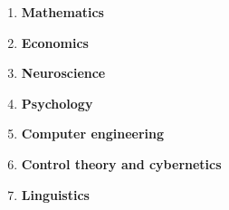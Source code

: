 \begin{enumerate}[itemsep=0.2cm]

    \item \textbf{Mathematics}



    \item \textbf{Economics}



    \item \textbf{Neuroscience}

    \item \textbf{Psychology}

    \item \textbf{Computer engineering}

    \item \textbf{Control theory and cybernetics}

    \item \textbf{Linguistics}

\end{enumerate}









